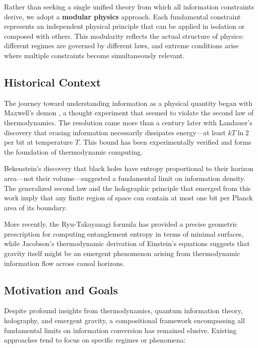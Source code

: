 \documentclass[11pt,a4paper]{article}
\theoremstyle{plain}
\theoremstyle{definition}
\theoremstyle{remark}
\begin{document}
Rather than seeking a single unified theory from which all information constraints derive, we adopt a \textbf{modular physics} approach. Each fundamental constraint represents an independent physical principle that can be applied in isolation or composed with others. This modularity reflects the actual structure of physics: different regimes are governed by different laws, and extreme conditions arise where multiple constraints become simultaneously relevant.

\subsection{Historical Context}

The journey toward understanding information as a physical quantity began with Maxwell's demon \cite{maxwell1871theory}, a thought experiment that seemed to violate the second law of thermodynamics. The resolution came more than a century later with Landauer's discovery \cite{landauer1961irreversibility} that erasing information necessarily dissipates energy—at least $kT\ln 2$ per bit at temperature $T$. This bound has been experimentally verified \cite{berut2012experimental} and forms the foundation of thermodynamic computing.

Bekenstein's discovery \cite{bekenstein1973black} that black holes have entropy proportional to their horizon area—not their volume—suggested a fundamental limit on information density. The generalized second law and the holographic principle that emerged from this work \cite{thooft1993dimensional,susskind1995world} imply that any finite region of space can contain at most one bit per Planck area of its boundary.

More recently, the Ryu-Takayanagi formula \cite{ryu2006holographic} has provided a precise geometric prescription for computing entanglement entropy in terms of minimal surfaces, while Jacobson's thermodynamic derivation \cite{jacobson1995thermodynamics} of Einstein's equations suggests that gravity itself might be an emergent phenomenon arising from thermodynamic information flow across causal horizons.

\subsection{Motivation and Goals}

Despite profound insights from thermodynamics, quantum information theory, holography, and emergent gravity, a compositional framework encompassing all fundamental limits on information conversion has remained elusive. Existing approaches tend to focus on specific regimes or phenomena:
\end{document}
